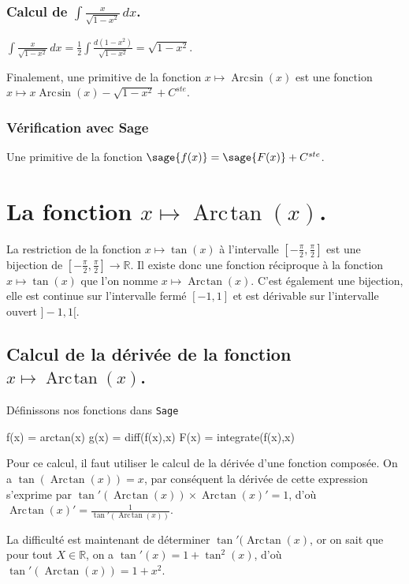 \documentclass[a4paper,landscape,17pt]{extreport} %
\def\eclaire{\mathbb}
\def\R{\ensuremath{\eclaire R}}
\renewcommand{\arcsin}{\mathop{\mathrm{Arc\mspace{2mu}sin}}}
\renewcommand{\arctan}{\mathop{\mathrm{Arc\mspace{2mu}tan}}}
\begin{document}
\subsubsection{Calcul de $\int \frac{x}{\sqrt{1- x^2}} \, dx $.}

$\int \frac{x}{\sqrt{1- x^2}} \, dx = \frac{1}{2} \int \frac{d(1-x^2)}{\sqrt{1- x^2}}= \sqrt{1- x^2} $.


Finalement, une primitive de la fonction $x \mapsto \arcsin(x) $ est une fonction  $ x \mapsto x \arcsin(x) - \sqrt{1- x^2} + C^{ste} $.

\subsubsection{Vérification avec Sage}


Une primitive de la fonction $\sage{f(x)} = \sage{F(x)} + C^{ste}$.


\section{La fonction  $x \mapsto \arctan(x) $.}


La restriction de la fonction $x \mapsto \tan(x) $ à l'intervalle $\left[-\frac{\pi}{2},\frac{\pi}{2}\right]$ est une bijection de $\left[-\frac{\pi}{2},\frac{\pi}{2}\right] \rightarrow \R $. Il existe donc une fonction réciproque à la fonction $x \mapsto \tan(x) $ que l'on nomme $x \mapsto \arctan(x) $. C'est également une bijection, elle est continue sur l'intervalle fermé  $ [-1,1]$ et est dérivable sur l'intervalle ouvert $]-1,1[$.


\subsection{Calcul de la dérivée de la fonction $x \mapsto \arctan(x) $.}
Définissons nos fonctions dans {\texttt{Sage}}
\begin{sageblock}
    f(x) = arctan(x)
    g(x) = diff(f(x),x)
    F(x) = integrate(f(x),x)
\end{sageblock}



Pour ce calcul, il faut utiliser le calcul de la dérivée d'une fonction composée. On a $\tan(\arctan(x))=x$, par conséquent la dérivée de cette expression s'exprime par $ \tan'(\arctan(x)) \times \arctan(x)' = 1$, d'où $\arctan(x)' = \frac{1}{\tan'(\arctan(x))} $.

La difficulté est maintenant de déterminer $\tan'(\arctan(x)$, or on sait que pour tout $X \in \R$, on a $ \tan'(x) =1+\tan^2(x) $, d'où $\tan'(\arctan(x)) = 1+x^2$.
\end{document}
